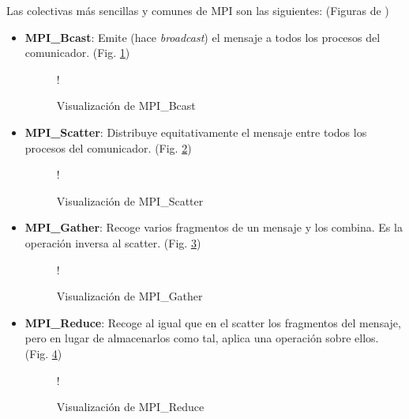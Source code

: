 Las colectivas más sencillas y comunes de MPI son las siguientes: (Figuras de \cite{cheung_mpi})
\begin{itemize}
  \item \textbf{MPI\_Bcast}: Emite (hace \textit{broadcast}) el mensaje a todos los procesos del comunicador. (Fig. \ref{fig:mpi_bcast})
  
  \begin{figure}[H]
    \vspace*{0.5cm}
    \centering
     {!} {
    
    }
    \caption{Visualización de MPI\_Bcast}
    \label{fig:mpi_bcast}
  \end{figure}

  \item \textbf{MPI\_Scatter}: Distribuye equitativamente el mensaje entre todos los procesos del comunicador. (Fig. \ref{fig:mpi_scatter})

  \begin{figure}[H]
    \vspace*{0.5cm}
    \centering
     {!} {
    
    }
    \caption{Visualización de MPI\_Scatter}
    \label{fig:mpi_scatter}
  \end{figure}

  \item \textbf{MPI\_Gather}: Recoge varios fragmentos de un mensaje y los combina. Es la operación inversa al scatter.  (Fig. \ref{fig:mpi_gather})

  \begin{figure}[H]
    \vspace*{0.5cm}
    \centering
     {!} {
    
    }
    \caption{Visualización de MPI\_Gather}
    \label{fig:mpi_gather}
  \end{figure}

  \item \textbf{MPI\_Reduce}: Recoge al igual que en el scatter los fragmentos del mensaje, pero en lugar de almacenarlos como tal, aplica una operación sobre ellos. (Fig. \ref{fig:mpi_reduce})

  \begin{figure}[H]
    \vspace*{0.5cm}
    \centering
     {!} {
    
    }
    \caption{Visualización de MPI\_Reduce}
    \label{fig:mpi_reduce}
  \end{figure}

\end{itemize}

